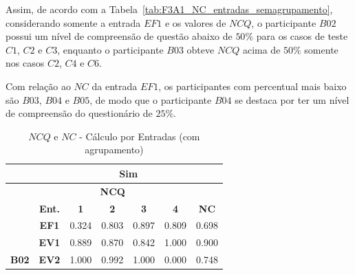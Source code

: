 Assim, de acordo com a Tabela~\ref{tab:F3A1_NC_entradas_semagrupamento}, considerando somente a entrada $EF1$ e os valores de $NCQ$, o participante $B02$ possui um nível de compreensão de questão abaixo de $50\%$ para os casos de teste $C1$, $C2$ e $C3$, enquanto o participante $B03$ obteve $NCQ$ acima de $50\%$ somente nos casos $C2$, $C4$ e $C6$.

Com relação ao $NC$ da entrada $EF1$, os participantes com percentual mais baixo são $B03$, $B04$ e $B05$, de modo que o participante $B04$ se destaca por ter um nível de compreensão do questionário de $25\%$.

\begin{table}[htbp]
	\centering
	\caption{$NCQ$ e $NC$ - Cálculo por Entradas (com agrupamento)}
	\begin{tabular}{|ccccccc|}
		\hline
		\rowcolor[HTML]{D0CECE} 
		\multicolumn{1}{|c|}{\cellcolor[HTML]{F2F2F2}\textbf{Agrupamento}} & \multicolumn{6}{c|}{Sim} \\ \hline
		\rowcolor[HTML]{D0CECE} 
		\multicolumn{1}{|c|}{\cellcolor[HTML]{D0CECE}} & \multicolumn{5}{c|}{\cellcolor[HTML]{D0CECE}\textbf{NCQ}} & \cellcolor[HTML]{D0CECE} \\ \cline{2-6}
		\rowcolor[HTML]{D0CECE} 
		\multicolumn{1}{|c|}{\multirow{-2}{*}{\cellcolor[HTML]{D0CECE}\textbf{Participante}}} & \multicolumn{1}{c|}{\cellcolor[HTML]{D0CECE}\textbf{Ent.}} & \multicolumn{1}{c|}{\cellcolor[HTML]{D0CECE}\textbf{1}} & \multicolumn{1}{c|}{\cellcolor[HTML]{D0CECE}\textbf{2}} & \multicolumn{1}{c|}{\cellcolor[HTML]{D0CECE}\textbf{3}} & \multicolumn{1}{c|}{\cellcolor[HTML]{D0CECE}\textbf{4}} & \multirow{-2}{*}{\cellcolor[HTML]{D0CECE}\textbf{NC}} \\ \hline
		\multicolumn{1}{|c|}{\cellcolor[HTML]{F2F2F2}} & \multicolumn{1}{c|}{\textbf{EF1}} & \multicolumn{1}{c|}{0.324} & \multicolumn{1}{c|}{0.803} & \multicolumn{1}{c|}{0.897} & \multicolumn{1}{c|}{0.809} & 0.698 \\ \cline{2-7} 
		\rowcolor[HTML]{F2F2F2} 
		\multicolumn{1}{|c|}{\cellcolor[HTML]{F2F2F2}} & \multicolumn{1}{c|}{\cellcolor[HTML]{F2F2F2}\textbf{EV1}} & \multicolumn{1}{c|}{\cellcolor[HTML]{F2F2F2}0.889} & \multicolumn{1}{c|}{\cellcolor[HTML]{F2F2F2}0.870} & \multicolumn{1}{c|}{\cellcolor[HTML]{F2F2F2}0.842} & \multicolumn{1}{c|}{\cellcolor[HTML]{F2F2F2}1.000} & 0.900 \\ \cline{2-7} 
		\multicolumn{1}{|c|}{\multirow{-3}{*}{\cellcolor[HTML]{F2F2F2}\textbf{B02}}} & \multicolumn{1}{c|}{\textbf{EV2}} & \multicolumn{1}{c|}{1.000} & \multicolumn{1}{c|}{0.992} & \multicolumn{1}{c|}{1.000} & \multicolumn{1}{c|}{0.000} & 0.748 \\ \hline

\end{tabular}
\end{table}
